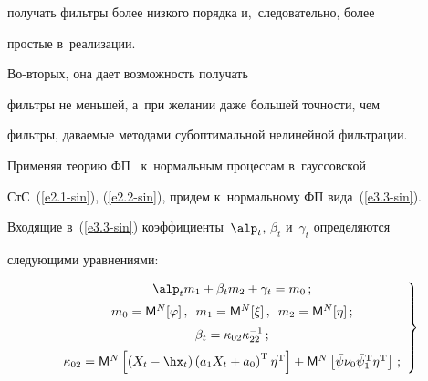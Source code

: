 получать фильтры более низкого порядка и,~следовательно, более


простые в~реализации. 





Во-вто\-рых, она дает возможность получать


фильтры не меньшей, а~при желании даже большей точности, чем


фильтры, даваемые методами субоптимальной нелинейной фильтрации.





Применяя теорию ФП~\cite{2-sin} к~нормальным процессам в~гауссовской 


СтС~(\ref{e2.1-sin}), (\ref{e2.2-sin}), придем к~нормальному ФП  вида~(\ref{e3.3-sin}). 


Входящие в~(\ref{e3.3-sin}) коэффициенты~$\alp_t$, $\beta_t$ и~$\gamma_t$ определяются 


сле\-ду\-ющи\-ми уравнениями:


   \begin{equation}


   \left.


   \begin{array}{c}


   \alp_t m_1 + \beta_t m_2 + \gamma_t=m_0\,;


  \\[6pt]


m_0 = {\sf M}^N  [\varphi]\,,\enskip 


m_1 = {\sf M}^N  [\xi]\,,\enskip 


m_2 = {\sf M}^N [\eta]\,; %


\\[6pt]


\beta_t =\kappa_{02} \kappa_{22}^{-1}\,; %


\\[6pt]


\kappa_{02} = {\sf M}^N \left[\left(X_t - \hx_t\right) 


\left(a_1 X_t+a_0\right)^{\mathrm{T}} \eta^{\mathrm{T}}\right]+ 


{\sf M}^N \left[\bar\psi  \nu_0\bar\psi_1^{\mathrm{T}} \eta^{\mathrm{T}}\right]\,;




\end{array}


\right\}


\label{e3.4-sin}


\end{equation}


